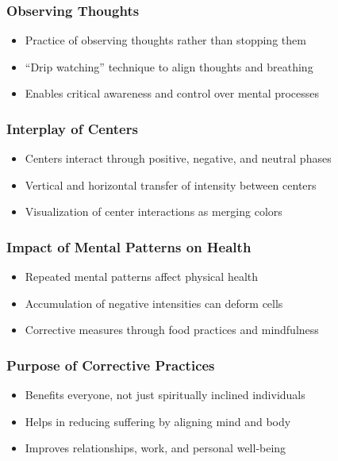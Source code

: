 \begin{frame}[fragile]\frametitle{Observing Thoughts}
    \begin{itemize}
        \item Practice of observing thoughts rather than stopping them
        \item “Drip watching” technique to align thoughts and breathing
        \item Enables critical awareness and control over mental processes
    \end{itemize}
\end{frame}

\begin{frame}[fragile]\frametitle{Interplay of Centers}
    \begin{itemize}
        \item Centers interact through positive, negative, and neutral phases
        \item Vertical and horizontal transfer of intensity between centers
        \item Visualization of center interactions as merging colors
    \end{itemize}
\end{frame}

\begin{frame}[fragile]\frametitle{Impact of Mental Patterns on Health}
    \begin{itemize}
        \item Repeated mental patterns affect physical health
        \item Accumulation of negative intensities can deform cells
        \item Corrective measures through food practices and mindfulness
    \end{itemize}
\end{frame}

\begin{frame}[fragile]\frametitle{Purpose of Corrective Practices}
    \begin{itemize}
        \item Benefits everyone, not just spiritually inclined individuals
        \item Helps in reducing suffering by aligning mind and body
        \item Improves relationships, work, and personal well-being
    \end{itemize}
\end{frame}

